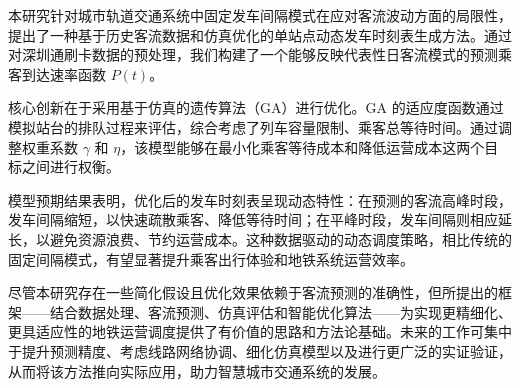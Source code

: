 
本研究针对城市轨道交通系统中固定发车间隔模式在应对客流波动方面的局限性，提出了一种基于历史客流数据和仿真优化的单站点动态发车时刻表生成方法。通过对深圳通刷卡数据的预处理，我们构建了一个能够反映代表性日客流模式的预测乘客到达速率函数 $P(t)$。

核心创新在于采用基于仿真的遗传算法（GA）进行优化。GA 的适应度函数通过模拟站台的排队过程来评估，综合考虑了列车容量限制、乘客总等待时间。通过调整权重系数 $\gamma$ 和 $\eta$，该模型能够在最小化乘客等待成本和降低运营成本这两个目标之间进行权衡。

模型预期结果表明，优化后的发车时刻表呈现动态特性：在预测的客流高峰时段，发车间隔缩短，以快速疏散乘客、降低等待时间；在平峰时段，发车间隔则相应延长，以避免资源浪费、节约运营成本。这种数据驱动的动态调度策略，相比传统的固定间隔模式，有望显著提升乘客出行体验和地铁系统运营效率。

尽管本研究存在一些简化假设且优化效果依赖于客流预测的准确性，但所提出的框架——结合数据处理、客流预测、仿真评估和智能优化算法——为实现更精细化、更具适应性的地铁运营调度提供了有价值的思路和方法论基础。未来的工作可集中于提升预测精度、考虑线路网络协调、细化仿真模型以及进行更广泛的实证验证，从而将该方法推向实际应用，助力智慧城市交通系统的发展。